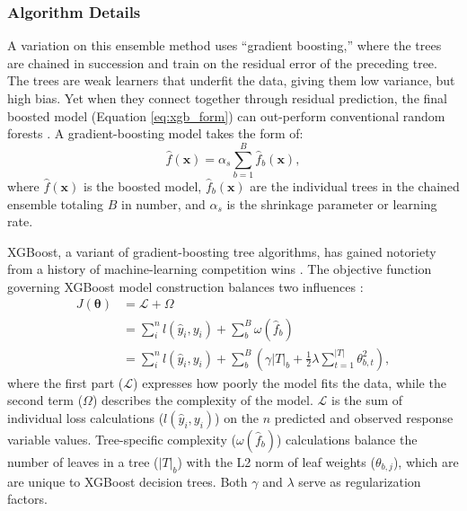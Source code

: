 \subsubsection{Algorithm Details}\label{ch3:xgb_details}

A variation on this ensemble method uses ``gradient boosting,'' where the trees are chained in succession and train on the residual error of the preceding tree. The trees are weak learners that underfit the data, giving them low variance, but high bias. Yet when they connect together through residual prediction, the final boosted model (Equation \ref{eq:xgb_form}) can out-perform conventional random forests \citep[p.\ 323]{james_introduction_2013}. A gradient-boosting model takes the form of:
\begin{equation}
\label{eq:xgb_form}
    \hat{f}(\textbf{x}) = \alpha_s\sum_{b=1}^{B} \hat{f}_{b}(\textbf{x}),
\end{equation}
where $\hat{f}(\textbf{x})$ is the boosted model, $\hat{f}_b(\textbf{x})$ are the individual trees in the chained ensemble totaling $B$ in number, and $\alpha_s$ is the shrinkage parameter or learning rate. 

XGBoost, a variant of gradient-boosting tree algorithms, has gained notoriety from a history of machine-learning competition wins \citep{chen_dmlcxgboost_2021}. The objective function governing XGBoost model construction balances two influences \citep{chen_xgboost_2016}:
\begin{equation}
\label{eq:xgb_objective}
\begin{aligned}
    J(\boldsymbol\theta) &= \mathcal{L} + \Omega \\
    &= \sum_{i}^{n}{l(\hat{y}_i,y_i)}+\sum_{b}^{B}\omega(\hat{f}_b) \\
    &= \sum_{i}^{n}{l(\hat{y}_i,y_i)}+\sum_{b}^{B}{\left({\gamma \left|T\right|_b}+\frac{1}{2} \lambda \sum_{t=1}^{\left|T\right|}{\theta_{b,t}^2}\right)},
\end{aligned}
\end{equation}
where the first part ($\mathcal{L}$) expresses how poorly the model fits the data, while the second term ($\Omega$) describes the complexity of the model. $\mathcal{L}$ is the sum of individual loss calculations ($l(\hat{y}_i,y_i)$) on the $n$ predicted and observed response variable values. Tree-specific complexity ($\omega(\hat{f}_b)$) calculations balance the number of leaves in a tree ($\left|T\right|_b$) with the L2 norm of leaf weights ($\theta_{b,j}$), which are are unique to XGBoost decision trees. Both $\gamma$ and $\lambda$ serve as regularization factors. 

